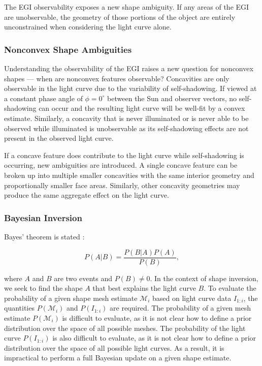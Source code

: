 The EGI observability exposes a new shape ambiguity. If any areas of the EGI are unobservable, the geometry of those portions of the object are entirely unconstrained when considering the light curve alone. 

\subsubsection{Nonconvex Shape Ambiguities}

Understanding the observability of the EGI raises a new question for nonconvex shapes --- when are nonconvex features observable? Concavities are only observable in the light curve due to the variability of self-shadowing. If viewed at a constant phase angle of $\phi = 0^\circ$ between the Sun and observer vectors, no self-shadowing can occur and the resulting light curve will be well-fit by a convex estimate. Similarly, a concavity that is never illuminated or is never able to be observed while illuminated is unobservable as its self-shadowing effects are not present in the observed light curve. 

If a concave feature does contribute to the light curve while self-shadowing is occurring, new ambiguities are introduced. A single concave feature can be broken up into multiple smaller concavities with the same interior geometry and proportionally smaller face areas. Similarly, other concavity geometries may produce the same aggregate effect on the light curve.

\subsubsection{Bayesian Inversion}

Bayes' theorem is stated \cite{mahler2014}:

\begin{equation}
  P(A \vert B) = \frac{P(B \vert A)P(A)}{P(B)},
\end{equation}

where $A$ and $B$ are two events and $P(B) \neq 0$. In the context of shape inversion, we seek to find the shape $A$ that best explains the light curve $B$. To evaluate the probability of a given shape mesh estimate $\mathcal{M}_i$ based on light curve data $I_{1:i}$, the quantities $P(\mathcal{M}_i)$ and $P(I_{1:i})$ are required. The probability of a given mesh estimate $P(\mathcal{M}_i)$ is difficult to evaluate, as it is not clear how to define a prior distribution over the space of all possible meshes. The probability of the light curve $P(I_{1:i})$ is also difficult to evaluate, as it is not clear how to define a prior distribution over the space of all possible light curves. As a result, it is impractical to perform a full Bayesian update on a given shape estimate.

